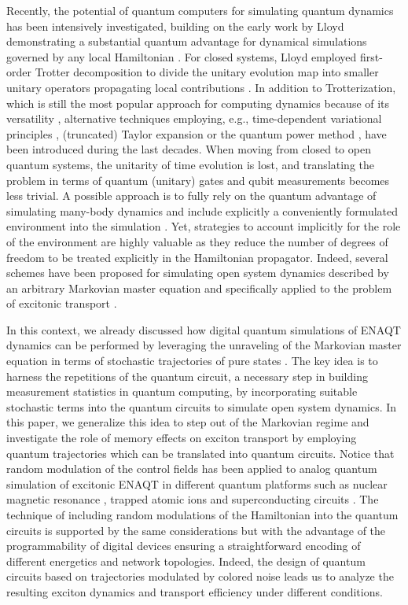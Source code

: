 \documentclass[12pt, amsmath, amssymb, graphicx]{iopart}
\begin{document}
Recently, the potential of quantum computers for simulating quantum dynamics has been intensively investigated, building on the early work by Lloyd demonstrating a substantial quantum advantage for dynamical simulations governed by any local Hamiltonian \cite{Lloyd1996a}.
For closed systems, Lloyd employed first-order Trotter decomposition to divide the unitary evolution map into smaller unitary operators propagating local contributions \cite{Lloyd1996a}. In addition to Trotterization, which is still the most popular approach for computing dynamics because of its versatility \cite{Jaderberg2022, Gallina2022, Bruschi2024, Poulin2011, Reiher2017, Sawaya2020}, alternative techniques employing, e.g., time-dependent variational principles \cite{Li2017, Yuan2019, Heya2023, Endo2020}, (truncated) Taylor expansion \cite{Berry2015} or the quantum power method \cite{Childs2021}, have been introduced during the last decades.
When moving from closed to open quantum systems, the unitarity of time evolution is lost, and translating the problem in terms of quantum (unitary) gates and qubit measurements becomes less trivial. A possible approach is to fully rely on the quantum advantage of simulating many-body dynamics and include explicitly a conveniently formulated environment into the simulation \cite{Guimaraes2024}. 
Yet, strategies to account implicitly for the role of the environment are highly valuable as they reduce the number of degrees of freedom to be treated explicitly in the Hamiltonian propagator. Indeed, several schemes have been proposed for simulating open system dynamics described by an arbitrary Markovian master equation \cite{Wang2011, Kamakari2022, Endo2020, Hu2020, Schlimgen2022} and specifically applied to the problem of excitonic transport \cite{Gupta2020, Mahdian2020a, Hu2021}.

In this context, we already discussed how digital quantum simulations of ENAQT dynamics can be performed by leveraging the unraveling of the Markovian master equation in terms of stochastic trajectories of pure states \cite{Gallina2022}. The key idea is to harness the repetitions of the quantum circuit, a necessary step in building measurement statistics in quantum computing, by incorporating suitable stochastic terms into the quantum circuits to simulate open system dynamics. In this paper, we generalize this idea to step out of the Markovian regime and investigate the role of memory effects on exciton transport by employing quantum trajectories which can be translated into quantum circuits.
Notice that random modulation of the control fields has been applied to analog quantum simulation of excitonic ENAQT in different quantum platforms such as nuclear magnetic resonance \cite{Wang2018}, trapped atomic ions \cite{Maier2019} and superconducting circuits \cite{Potocnik2018}.
The technique of including random modulations of the Hamiltonian into the quantum circuits is supported by the same considerations but with the advantage of the programmability of digital devices ensuring a straightforward encoding of different energetics and network topologies.   
Indeed, the design of quantum circuits based on trajectories modulated by colored noise leads us to analyze the resulting exciton dynamics and transport efficiency under different conditions.
\end{document}
